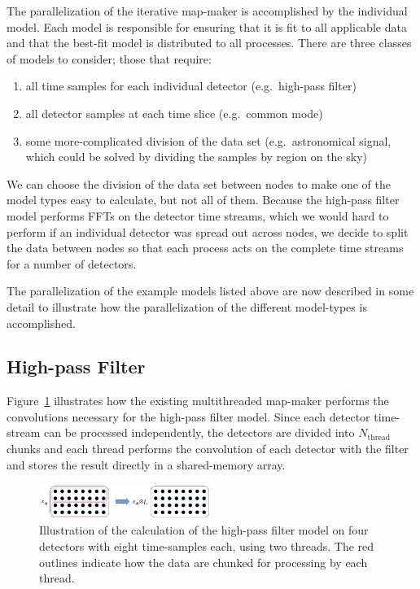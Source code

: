 \documentclass[oneside,11pt]{starlink}
\begin{document}
The parallelization of the iterative map-maker is accomplished by the
individual model. Each model is responsible for ensuring that it is
fit to all applicable data and that the best-fit model is distributed
to all processes. There are three classes of models to consider; those
that require:

\begin{enumerate}
\item all time samples for each individual detector (e.g.\ high-pass
  filter)
\item all detector samples at each time slice (e.g.\ common mode)
\item some more-complicated division of the data set
  (e.g.\ astronomical signal, which could be solved by dividing the
  samples by region on the sky)
\end{enumerate}

We can choose the division of the data set between nodes to make one
of the model types easy to calculate, but not all of them. Because the
high-pass filter model performs FFTs on the detector time streams,
which we would hard to perform if an individual detector was spread
out across nodes, we decide to split the data between nodes so that
each process acts on the complete time streams for a number of
detectors.

The parallelization of the example models listed above are now described
in some detail to illustrate how the parallelization of the different
model-types is accomplished.

\subsection{High-pass Filter}

Figure~\ref{fig:serial_highpass} illustrates how the existing
multithreaded map-maker performs the convolutions necessary for the
high-pass filter model. Since each detector time-stream can be
processed independently, the detectors are divided into
$N_{\mathrm{thread}}$ chunks and each thread performs the convolution of
each detector with the filter and stores the result directly in a
shared-memory array.

\begin{figure}[ht]
\begin{center}
\includegraphics[width=0.5\textwidth]{ssn79_serial_highpass}
\caption[Serial High-pass Filter Model]{Illustration of the
  calculation of the high-pass filter model on four detectors with
  eight time-samples each, using two threads. The red outlines
  indicate how the data are chunked for processing by each thread.}
\label{fig:serial_highpass}
\end{center}
\end{figure}
\end{document}
